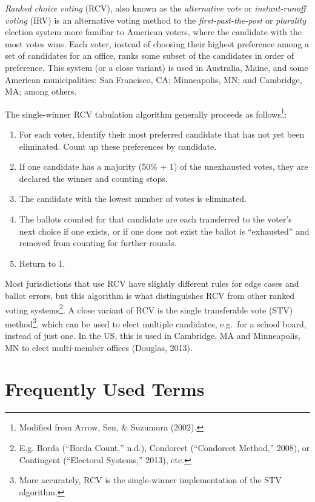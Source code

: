 \documentclass[12pt,twoside]{reedthesis}
\begin{document}
\emph{Ranked choice voting} (RCV), also known as the \emph{alternative vote} or \emph{instant-runoff voting} (IRV) is an alternative voting method to the \emph{first-past-the-post} or \emph{plurality} election system more familiar to American voters, where the candidate with the most votes wins. Each voter, instead of choosing their highest preference among a set of candidates for an office, ranks some subset of the candidates in order of preference. This system (or a close variant) is used in Australia, Maine, and some American municipalities: San Francisco, CA; Minneapolis, MN; and Cambridge, MA; among others.

The single-winner RCV tabulation algorithm generally proceeds as follows\footnote{Modified from Arrow, Sen, \& Suzumura (2002).}:
\begin{enumerate}
\def\labelenumi{\arabic{enumi}.}
\item
  For each voter, identify their most preferred candidate that has not yet been eliminated. Count up these preferences by candidate.
\item
  If one candidate has a majority (50\% + 1) of the unexhausted votes, they are declared the winner and counting stops.
\item
  The candidate with the lowest number of votes is eliminated.
\item
  The ballots counted for that candidate are each transferred to the voter's next choice if one exists, or if one does not exist the ballot is ``exhausted'' and removed from counting for further rounds.
\item
  Return to 1.
\end{enumerate}
Most jurisdictions that use RCV have slightly different rules for edge cases and ballot errors, but this algorithm is what distinguishes RCV from other ranked voting systems\footnote{E.g. Borda (``Borda Count,'' n.d.), Condorcet (``Condorcet Method,'' 2008), or Contingent (``Electoral Systems,'' 2013), etc.}. A close variant of RCV is the single transferable vote (STV) method\footnote{More accurately, RCV is the single-winner implementation of the STV algorithm.}, which can be used to elect multiple candidates, e.g.~for a school board, instead of just one. In the US, this is used in Cambridge, MA and Minneapolis, MN to elect multi-member offices (Douglas, 2013).

\hypertarget{frequently-used-terms}{%
\section{Frequently Used Terms}\label{frequently-used-terms}}
\end{document}
